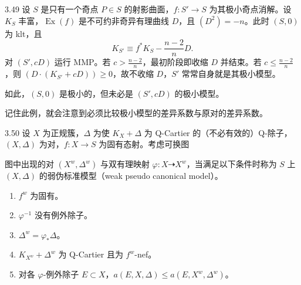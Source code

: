 \begin{example}{3.49}
设 $S$ 是只有一个奇点 $P\in S$ 的射影曲面，$f:S'\to S$ 为其极小奇点消解。设 $K_S$ 丰富，$\operatorname{Ex}(f)$ 是不可约非奇异有理曲线 $D$，且 $(D^2)=-n$。此时 $(S,0)$ 为 klt，且
\[
K_{S'}\equiv f^*K_S-\frac{n-2}{n}D.
\]
对 $(S',cD)$ 运行 MMP。若 $c>\frac{n-2}{n}$，最初阶段即收缩 $D$ 并结束。若 $c\le\frac{n-2}{n}$，则 $(D\cdot(K_{S'}+cD))\ge0$，故不收缩 $D$，$S'$ 常常自身就是其极小模型。

如此，$(S,0)$ 是极小的，但未必是 $(S',cD)$ 的极小模型。
\end{example}

记住此例，就会注意到必须比较极小模型的差异系数与原对的差异系数。

\begin{definition}{3.50}
设 $X$ 为正规簇，$\Delta$ 为使 $K_X+\Delta$ 为 Q-Cartier 的（不必有效的）Q-除子，$(X,\Delta)$ 为对，$f:X\to S$ 为固有态射。考虑可换图
\begin{center}
\end{center}
图中出现的对 $(X^{w},\Delta^{w})$ 与双有理映射 $\varphi:X\dashrightarrow X^{w}$，当满足以下条件时称为 $S$ 上 $(X,\Delta)$ 的弱伪标准模型（weak pseudo canonical model）。
\begin{enumerate}[label=(\arabic*)]
\item $f^{w}$ 为固有。
\item $\varphi^{-1}$ 没有例外除子。
\item $\Delta^{w}=\varphi_*\Delta$。
\item $K_{X^{w}}+\Delta^{w}$ 为 Q-Cartier 且为 $f^{w}$-nef。
\item 对各 $\varphi$-例外除子 $E\subset X$，$a(E,X,\Delta)\le a(E,X^{w},\Delta^{w})$。
\end{enumerate}
\end{definition}

